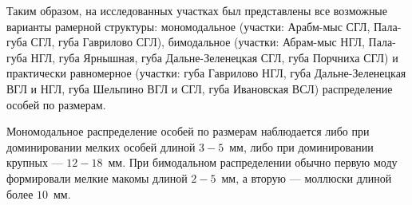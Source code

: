 Таким образом, на исследованных участках был представлены все возможные варианты рамерной структуры: мономодальное (участки: Арабм-мыс СГЛ, Пала-губа СГЛ, губа Гаврилово СГЛ), бимодальное (участки: Абрам-мыс НГЛ, Пала-губа НГЛ, губа Ярнышная, губа Дальне-Зеленецкая СГЛ, губа Порчниха СГЛ) и практически равномерное (участки: губа Гаврилово НГЛ, губа Дальне-Зеленецкая ВГЛ и НГЛ, губа Шельпино ВГЛ и СГЛ, губа Ивановская ВСЛ) распределение особей по размерам. 

Мономодальное распределение особей по размерам наблюдается либо при доминировании мелких особей длиной $3-5$~мм, либо при доминировании крупных --- $12-18$~мм.
При бимодальном распределении обычно первую моду формировали мелкие макомы длиной $2-5$~мм, а вторую --- моллюски длиной более $10$~мм.

	
